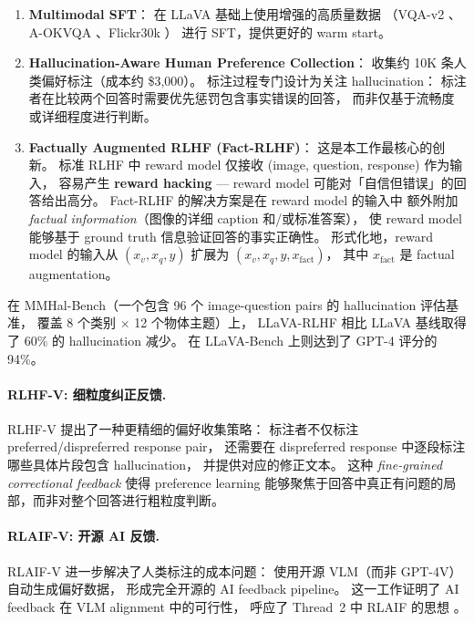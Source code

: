 \begin{enumerate}[leftmargin=2em]
  \item \textbf{Multimodal SFT}：
    在 LLaVA 基础上使用增强的高质量数据
    （VQA-v2 \cite{goyal2017vqav2}、A-OKVQA \cite{schwenk2022aokvqa}、Flickr30k \cite{plummer2015flickr30k}）
    进行 SFT，提供更好的 warm start。

  \item \textbf{Hallucination-Aware Human Preference Collection}：
    收集约 10K 条人类偏好标注（成本约 \$3,000）。
    标注过程专门设计为关注 hallucination：
    标注者在比较两个回答时需要优先惩罚包含事实错误的回答，
    而非仅基于流畅度或详细程度进行判断。

  \item \textbf{Factually Augmented RLHF (Fact-RLHF)}：
    这是本工作最核心的创新。
    标准 RLHF 中 reward model 仅接收 (image, question, response) 作为输入，
    容易产生 \textbf{reward hacking} ---
    reward model 可能对「自信但错误」的回答给出高分。
    Fact-RLHF 的解决方案是在 reward model 的输入中
    额外附加 \textit{factual information}（图像的详细 caption 和/或标准答案），
    使 reward model 能够基于 ground truth 信息验证回答的事实正确性。
    形式化地，reward model 的输入从 $(x_v, x_q, y)$ 扩展为 $(x_v, x_q, y, x_{\text{fact}})$，
    其中 $x_{\text{fact}}$ 是 factual augmentation。
\end{enumerate}

\noindent
在 MMHal-Bench（一个包含 96 个 image-question pairs 的 hallucination 评估基准，
覆盖 8 个类别 $\times$ 12 个物体主题）上，
LLaVA-RLHF 相比 LLaVA 基线取得了 60\% 的 hallucination 减少。
在 LLaVA-Bench 上则达到了 GPT-4 评分的 94\%。

\paragraph{RLHF-V: 细粒度纠正反馈.}
RLHF-V \cite{yu2023rlhfv} 提出了一种更精细的偏好收集策略：
标注者不仅标注 preferred/dispreferred response pair，
还需要在 dispreferred response 中逐段标注哪些具体片段包含 hallucination，
并提供对应的修正文本。
这种 \textit{fine-grained correctional feedback} 使得 preference learning
能够聚焦于回答中真正有问题的局部，而非对整个回答进行粗粒度判断。

\paragraph{RLAIF-V: 开源 AI 反馈.}
RLAIF-V \cite{yu2024rlaifv} 进一步解决了人类标注的成本问题：
使用开源 VLM（而非 GPT-4V）自动生成偏好数据，
形成完全开源的 AI feedback pipeline。
这一工作证明了 AI feedback 在 VLM alignment 中的可行性，
呼应了 Thread~2 中 RLAIF \cite{lee2023rlaif} 的思想
。

